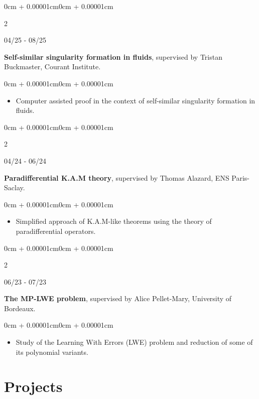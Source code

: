 \documentclass[10pt, letterpaper]{article}
\newenvironment{highlights}{
    \begin{itemize}[
        topsep=0.10cm,
        parsep=0.10cm,
        partopsep=0pt,
        itemsep=0pt,
        leftmargin=0cm + 10pt
    ]
}{
    \end{itemize}
}
\newenvironment{onecolentry}{
    \begin{adjustwidth}{0cm + 0.00001cm}{0cm + 0.00001cm}
}{
    \end{adjustwidth}
}
\newenvironment{twocolentry}[2][]{
    \onecolentry
    \def\firstColumn{#2}
    \setcolumnwidth{2.3cm, \fill}
    \begin{paracol}{2}
    \raggedright \firstColumn \switchcolumn
}{
    \end{paracol}
    \endonecolentry
}
\begin{document}
\begin{twocolentry}{04/25 - 08/25}
    \textbf{Self-similar singularity formation in fluids}, supervised by Tristan Buckmaster, Courant Institute.
\end{twocolentry}

\vspace{0.10cm}
\begin{onecolentry}
    \begin{highlights}
        \item Computer assisted proof in the context of self-similar singularity formation in fluids.
    \end{highlights}
\end{onecolentry}

\vspace{0.2cm}

\begin{twocolentry}{04/24 - 06/24}
    \textbf{Paradifferential K.A.M theory}, supervised by Thomas Alazard, ENS Paris-Saclay.
\end{twocolentry}

\vspace{0.10cm}
\begin{onecolentry}
    \begin{highlights}
        \item Simplified approach of K.A.M-like theorems using the theory of paradifferential operators.
    \end{highlights}
\end{onecolentry}

\vspace{0.2cm}

\begin{twocolentry}{06/23 - 07/23}
    \textbf{The MP-LWE problem}, supervised by Alice Pellet-Mary, University of Bordeaux.
\end{twocolentry}

\vspace{0.10cm}
\begin{onecolentry}
    \begin{highlights}
        \item Study of the Learning With Errors (LWE) problem and reduction of some of its polynomial variants.
    \end{highlights}
\end{onecolentry}

\vspace{0.2cm}

\section{Projects}
\end{document}

